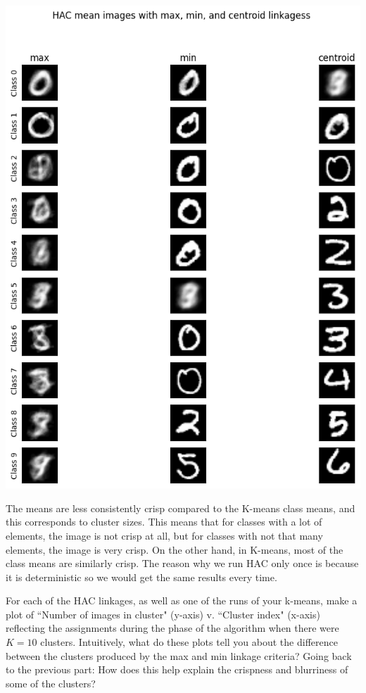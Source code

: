 \documentclass[expanded]{lkx_pset}
\begin{document}
\begin{parts}
	\begin{center}
		\includegraphics[scale = 0.7]{figures/HAC-class_means.png}
	\end{center}

	The means are less consistently crisp compared to the K-means class means, and this corresponds to cluster sizes. This means that for classes with a lot of elements, the image is not crisp at all, but for classes with not that many elements, the image is very crisp. On the other hand, in K-means, most of the class means are similarly crisp. The reason why we run HAC only once is because it is deterministic so we would get the same results every time.

	\begin{part}{5} For each of the HAC linkages, as well as one of the runs of your
		k-means, make a plot of ``Number of images in cluster" (y-axis)
		v. ``Cluster index" (x-axis) reflecting the assignments during the
		phase of the algorithm when there were $K=10$ clusters. Intuitively, what do these plots tell you about the difference between the clusters produced by the max and min linkage criteria? Going back to the previous part: How does this help explain the crispness and blurriness of some of the clusters?
	\end{part}


\end{parts}
\end{document}
